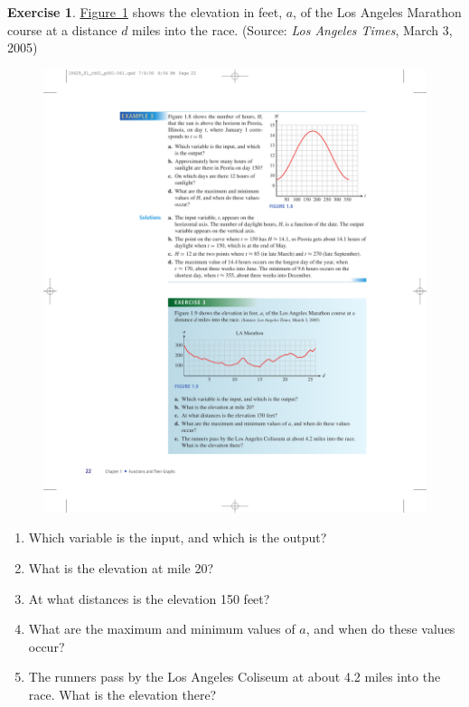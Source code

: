 \documentclass[10pt,]{book}
\theoremstyle{plain}
\theoremstyle{definition}
\theoremstyle{definition}
\theoremstyle{definition}
\newtheorem{exercise}[theorem]{Exercise}
\begin{document}
\begin{exercise}\label{exercise-LA-marathon}
\hyperref[fig-LA-marathon]{Figure~\ref{fig-LA-marathon}}  shows the elevation in feet, \(a\), of the Los Angeles Marathon course at a distance \(d\) miles into the race. (Source: \emph{Los Angeles Times}, March 3, 2005) \begin{figure}
\centering
\includegraphics[width=1\linewidth]{images/fig-LA-marathon}
\caption{\label{fig-LA-marathon}}
\end{figure}
\leavevmode%
\begin{enumerate}[label=\alph*]
\item\hypertarget{li-23}{}Which variable is the input, and which is the output?%
\item\hypertarget{li-24}{}What is the elevation at mile 20?%
\item\hypertarget{li-25}{}At what distances is the elevation 150 feet?%
\item\hypertarget{li-26}{}What are the maximum and minimum values of \(a\), and when do these values occur?%
\item\hypertarget{li-27}{}The runners pass by the Los Angeles Coliseum at about 4.2 miles into the race. What is the elevation there?%
\end{enumerate}
\end{exercise}
\typeout{************************************************}
\typeout{************************************************}
\end{document}
